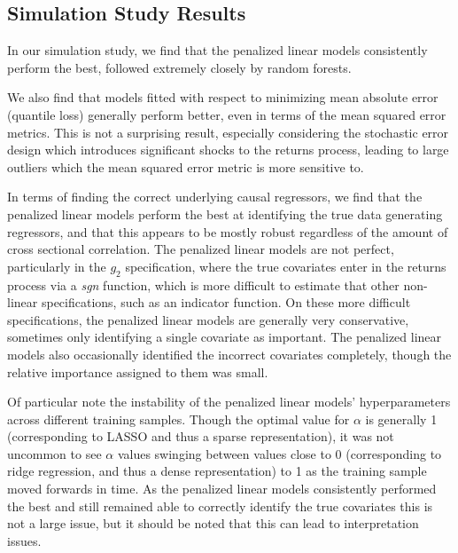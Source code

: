 \documentclass[a4paper, table]{article}
\begin{document}
\subsection{Simulation Study Results}


In our simulation study, we find that the penalized linear models consistently perform the best, followed extremely closely by random forests. 

We also find that models fitted with respect to minimizing mean absolute error (quantile loss) generally perform better, even in terms of the mean squared error metrics. This is not a surprising result, especially considering the stochastic error design which introduces significant shocks to the returns process, leading to large outliers which the mean squared error metric is more sensitive to. 

In terms of finding the correct underlying causal regressors, we find that the penalized linear models perform the best at identifying the true data generating regressors, and that this appears to be mostly robust regardless of the amount of cross sectional correlation. The penalized linear models are not perfect, particularly in the $g_2$ specification, where the true covariates enter in the returns process via a \textit{sgn} function, which is more difficult to estimate that other non-linear specifications, such as an indicator function. On these more difficult specifications, the penalized linear models are generally very conservative, sometimes only identifying a single covariate as important. The penalized linear models also occasionally identified the incorrect covariates completely, though the relative importance assigned to them was small.

Of particular note the instability of the penalized linear models' hyperparameters across different training samples. Though the optimal value for $\alpha$ is generally 1 (corresponding to LASSO and thus a sparse representation), it was not uncommon to see $\alpha$ values swinging between values close to 0 (corresponding to ridge regression, and thus a dense representation) to 1 as the training sample moved forwards in time. As the penalized linear models consistently performed the best and still remained able to correctly identify the true covariates this is not a large issue, but it should be noted that this can lead to interpretation issues.
\end{document}

